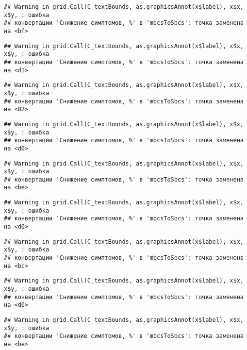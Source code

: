 \documentclass[
]{article}
\begin{document}
\begin{verbatim}
## Warning in grid.Call(C_textBounds, as.graphicsAnnot(x$label), x$x, x$y, : ошибка
## конвертации 'Снижение симптомов, %' в 'mbcsToSbcs': точка заменена на <bf>
\end{verbatim}

\begin{verbatim}
## Warning in grid.Call(C_textBounds, as.graphicsAnnot(x$label), x$x, x$y, : ошибка
## конвертации 'Снижение симптомов, %' в 'mbcsToSbcs': точка заменена на <d1>
\end{verbatim}

\begin{verbatim}
## Warning in grid.Call(C_textBounds, as.graphicsAnnot(x$label), x$x, x$y, : ошибка
## конвертации 'Снижение симптомов, %' в 'mbcsToSbcs': точка заменена на <82>
\end{verbatim}

\begin{verbatim}
## Warning in grid.Call(C_textBounds, as.graphicsAnnot(x$label), x$x, x$y, : ошибка
## конвертации 'Снижение симптомов, %' в 'mbcsToSbcs': точка заменена на <d0>
\end{verbatim}

\begin{verbatim}
## Warning in grid.Call(C_textBounds, as.graphicsAnnot(x$label), x$x, x$y, : ошибка
## конвертации 'Снижение симптомов, %' в 'mbcsToSbcs': точка заменена на <be>
\end{verbatim}

\begin{verbatim}
## Warning in grid.Call(C_textBounds, as.graphicsAnnot(x$label), x$x, x$y, : ошибка
## конвертации 'Снижение симптомов, %' в 'mbcsToSbcs': точка заменена на <d0>
\end{verbatim}

\begin{verbatim}
## Warning in grid.Call(C_textBounds, as.graphicsAnnot(x$label), x$x, x$y, : ошибка
## конвертации 'Снижение симптомов, %' в 'mbcsToSbcs': точка заменена на <bc>
\end{verbatim}

\begin{verbatim}
## Warning in grid.Call(C_textBounds, as.graphicsAnnot(x$label), x$x, x$y, : ошибка
## конвертации 'Снижение симптомов, %' в 'mbcsToSbcs': точка заменена на <d0>
\end{verbatim}

\begin{verbatim}
## Warning in grid.Call(C_textBounds, as.graphicsAnnot(x$label), x$x, x$y, : ошибка
## конвертации 'Снижение симптомов, %' в 'mbcsToSbcs': точка заменена на <be>
\end{verbatim}
\end{document}
